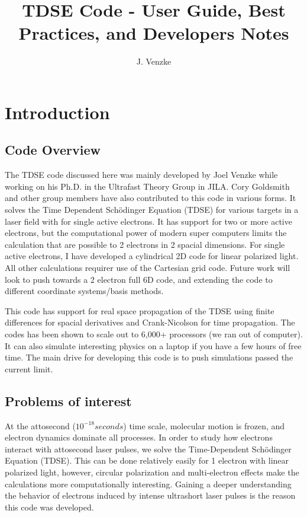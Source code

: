 \documentclass{article}
\title{TDSE Code - User Guide, Best Practices, and Developers Notes}
\author{J. Venzke}
\begin{document}
\maketitle

\tableofcontents
\newpage

\section{Introduction} %
\label{sec:introduction}
\subsection{Code Overview} %
\label{sub:code_overview}
The TDSE code discussed here was mainly developed by Joel Venzke while working on his Ph.D. in the Ultrafast Theory Group in JILA. Cory Goldsmith and other group members have also contributed to this code in various forms. It solves the Time Dependent Sch\"{o}dinger Equation (TDSE) for various targets in a laser field with for single active electrons. It has support for two or more active electrons, but the computational power of modern super computers limits the calculation that are possible to 2 electrons in 2 spacial dimensions. For single active electrons, I have developed a cylindrical 2D code for linear polarized light. All other calculations requirer use of the Cartesian grid code. Future work will look to push towards a 2 electron full 6D code, and extending the code to different coordinate systems/basis methods.

This code has support for real space propagation of the TDSE using finite differences for spacial derivatives and Crank-Nicolson for time propagation. The codes has been shown to scale out to 6,000+ processors (we ran out of computer). It can also simulate interesting physics on a laptop if you have a few hours of free time. The main drive for developing this code is to push simulations passed the current limit.

\subsection{Problems of interest} %
\label{sub:problems_of_interest}
At the attosecond ($10^{-18} seconds$) time scale, molecular motion is frozen, and electron dynamics dominate all processes. In order to study how electrons interact with attosecond laser pulses, we solve the Time-Dependent Sch\"{o}dinger Equation (TDSE). This can be done relatively easily for 1 electron with linear polarized light, however, circular polarization and multi-electron effects make the calculations more computationally interesting. Gaining a deeper understanding the behavior of electrons induced by intense ultrashort laser pulses is the reason this code was developed.
\end{document}
